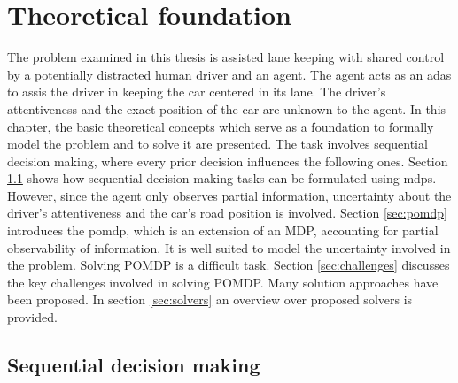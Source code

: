 \chapter{Theoretical foundation}
\label{sec:theory}


The problem examined in this thesis is assisted lane keeping with shared control by a potentially distracted human driver and an agent. The agent acts as an \gls{adas} to assis the driver in keeping the car centered in its lane. The driver's attentiveness and the exact position of the car are unknown to the agent. In this chapter, the basic theoretical concepts which serve as a foundation to formally model the problem and to solve it are presented. The task involves sequential decision making, where every prior decision influences the following ones. Section \ref{sec:mdp} shows how sequential decision making tasks can be formulated using \Glspl{mdp}. However, since the agent only observes partial information, uncertainty about the driver's attentiveness and the car's road position is involved. Section \ref{sec:pomdp} introduces the \Gls{pomdp}, which is an extension of an MDP, accounting for partial observability of information. It is well suited to model the uncertainty involved in the problem. Solving POMDP is a difficult task. Section \ref{sec:challenges} discusses the key challenges involved in solving POMDP. Many solution approaches have been proposed. In section \ref{sec:solvers} an overview over proposed solvers is provided.

\section{Sequential decision making}
\label{sec:mdp}

